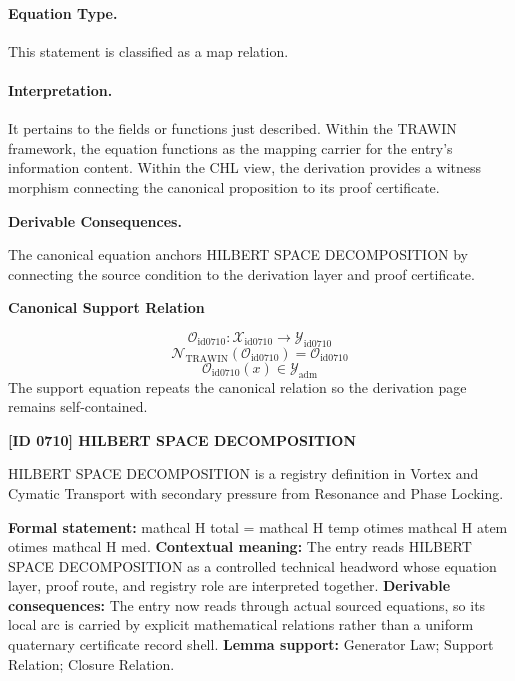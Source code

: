 \paragraph{Equation Type.}
This statement is classified as a map relation.

\paragraph{Interpretation.}
It pertains to the fields or functions just described. Within the TRAWIN framework, the equation functions as the mapping carrier for the entry’s information content. Within the CHL view, the derivation provides a witness morphism connecting the canonical proposition to its proof certificate.

\par\vspace{0.35em}
\noindent\textbf{Derivable Consequences.}\quad
\begingroup
\footnotesize
\raggedright
The canonical equation anchors HILBERT SPACE DECOMPOSITION by connecting the source condition to the derivation layer and proof certificate.
\par\endgroup

\noindent\textbf{Canonical Support Relation}\par
\[
\mathcal{O}_{\mathrm{id0710}}:\mathcal{X}_{\mathrm{id0710}}\longrightarrow\mathcal{Y}_{\mathrm{id0710}}
\]
\[
\mathcal{N}_{\mathrm{TRAWIN}}(\mathcal{O}_{\mathrm{id0710}})=\mathcal{O}_{\mathrm{id0710}}
\]
\[
\mathcal{O}_{\mathrm{id0710}}(x)\in\mathcal{Y}_{\mathrm{adm}}
\]
\noindent The support equation repeats the canonical relation so the derivation page remains self-contained.\par

\clearpage
\noindent\textbf{[ID 0710] HILBERT SPACE DECOMPOSITION}\par
\vspace{0.35em}
\begingroup\small
{}
HILBERT SPACE DECOMPOSITION is a registry definition in Vortex and Cymatic Transport with secondary pressure from Resonance and Phase Locking.

\begingroup\footnotesize\setlength{\emergencystretch}{3em}\sloppy
\textbf{Formal statement:} mathcal H total = mathcal H temp otimes mathcal H atem otimes mathcal H med. \textbf{Contextual meaning:} The entry reads HILBERT SPACE DECOMPOSITION as a controlled technical headword whose equation layer, proof route, and registry role are interpreted together. \textbf{Derivable consequences:} The entry now reads through actual sourced equations, so its local arc is carried by explicit mathematical relations rather than a uniform quaternary certificate record shell. \textbf{Lemma support:} Generator Law; Support Relation; Closure Relation.\par
\endgroup

